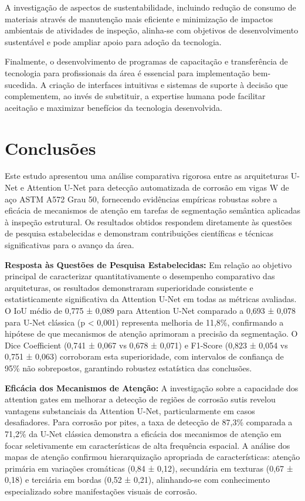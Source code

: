 \documentclass[12pt,a4paper,twoside]{article}
\begin{document}
A investigação de aspectos de sustentabilidade, incluindo redução de consumo de materiais através de manutenção mais eficiente e minimização de impactos ambientais de atividades de inspeção, alinha-se com objetivos de desenvolvimento sustentável e pode ampliar apoio para adoção da tecnologia.

Finalmente, o desenvolvimento de programas de capacitação e transferência de tecnologia para profissionais da área é essencial para implementação bem-sucedida. A criação de interfaces intuitivas e sistemas de suporte à decisão que complementem, ao invés de substituir, a expertise humana pode facilitar aceitação e maximizar benefícios da tecnologia desenvolvida.

\section{Conclusões}
\label{sec:conclusoes}

Este estudo apresentou uma análise comparativa rigorosa entre as arquiteturas U-Net e Attention U-Net para detecção automatizada de corrosão em vigas W de aço ASTM A572 Grau 50, fornecendo evidências empíricas robustas sobre a eficácia de mecanismos de atenção em tarefas de segmentação semântica aplicadas à inspeção estrutural. Os resultados obtidos respondem diretamente às questões de pesquisa estabelecidas e demonstram contribuições científicas e técnicas significativas para o avanço da área.

\textbf{Resposta às Questões de Pesquisa Estabelecidas:} Em relação ao objetivo principal de caracterizar quantitativamente o desempenho comparativo das arquiteturas, os resultados demonstraram superioridade consistente e estatisticamente significativa da Attention U-Net em todas as métricas avaliadas. O IoU médio de 0,775 ± 0,089 para Attention U-Net comparado a 0,693 ± 0,078 para U-Net clássica (p < 0,001) representa melhoria de 11,8\%, confirmando a hipótese de que mecanismos de atenção aprimoram a precisão da segmentação. O Dice Coefficient (0,741 ± 0,067 vs 0,678 ± 0,071) e F1-Score (0,823 ± 0,054 vs 0,751 ± 0,063) corroboram esta superioridade, com intervalos de confiança de 95\% não sobrepostos, garantindo robustez estatística das conclusões.

\textbf{Eficácia dos Mecanismos de Atenção:} A investigação sobre a capacidade dos attention gates em melhorar a detecção de regiões de corrosão sutis revelou vantagens substanciais da Attention U-Net, particularmente em casos desafiadores. Para corrosão por pites, a taxa de detecção de 87,3\% comparada a 71,2\% da U-Net clássica demonstra a eficácia dos mecanismos de atenção em focar seletivamente em características de alta frequência espacial. A análise dos mapas de atenção confirmou hierarquização apropriada de características: atenção primária em variações cromáticas (0,84 ± 0,12), secundária em texturas (0,67 ± 0,18) e terciária em bordas (0,52 ± 0,21), alinhando-se com conhecimento especializado sobre manifestações visuais de corrosão.
\end{document}
